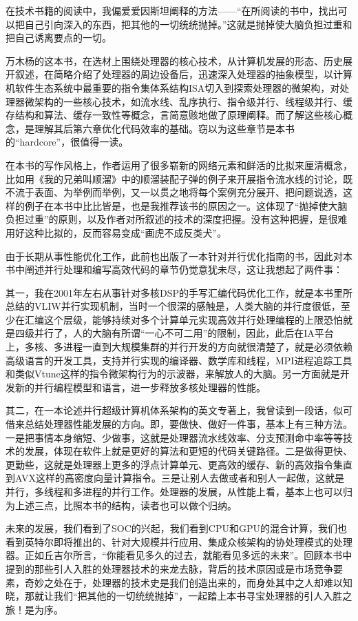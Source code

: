 \documentclass[12pt,UTF8]{ctexbook}
\begin{document}
在技术书籍的阅读中，我偏爱爱因斯坦阐释的方法——“在所阅读的书中，找出可以把自己引向深入的东西，把其他的一切统统抛掉。”这就是抛掉使大脑负担过重和把自己诱离要点的一切。

万木杨的这本书，在选材上围绕处理器的核心技术，从计算机发展的形态、历史展开叙述，在简略介绍了处理器的周边设备后，迅速深入处理器的抽象模型，以计算机软件生态系统中最重要的指令集体系结构ISA切入到探索处理器的微架构，对处理器微架构的一些核心技术，如流水线、乱序执行、指令级并行、线程级并行、缓存结构和算法、缓存一致性等概念，言简意赅地做了原理阐释。而了解这些核心概念，是理解其后第六章优化代码效率的基础。窃以为这些章节是本书的“hardcore”，很值得一读。

在本书的写作风格上，作者运用了很多崭新的网络元素和鲜活的比拟来厘清概念，比如用《我的兄弟叫顺溜》中的顺溜装配子弹的例子来开展指令流水线的讨论，既不流于表面、为举例而举例，又一以贯之地将每个案例充分展开、把问题说透，这样的例子在本书中比比皆是，也是我推荐该书的原因之一。这体现了“抛掉使大脑负担过重”的原则，以及作者对所叙述的技术的深度把握。没有这种把握，是很难用好这种比拟的，反而容易变成“画虎不成反类犬”。

由于长期从事性能优化工作，此前也出版了一本针对并行优化指南的书，因此对本书中阐述并行处理和编写高效代码的章节仍觉意犹未尽，这让我想起了两件事：

其一，我在2001年左右从事针对多核DSP的手写汇编代码优化工作，就是本书里所总结的VLIW并行实现机制，当时一个很深的感触是，人类大脑的并行度很低，至少在汇编这个层级，能够持续对多个计算单元实现高效并行处理编程的上限恐怕就是四级并行了，人的大脑有所谓“一心不可二用”的限制，因此，此后在IA平台上，多核、多进程一直到大规模集群的并行开发的方向就很清楚了，就是必须依赖高级语言的开发工具，支持并行实现的编译器、数学库和线程，MPI进程追踪工具和类似Vtune这样的指令微架构行为的示波器，来解放人的大脑。另一方面就是开发新的并行编程模型和语言，进一步释放多核处理器的性能。

其二，在一本论述并行超级计算机体系架构的英文专著上，我曾读到一段话，似可借来总结处理器性能发展的方向。即，要做快、做好一件事，基本上有三种方法。一是把事情本身缩短、少做事，这就是处理器流水线效率、分支预测命中率等等技术的发展，体现在软件上就是更好的算法和更短的代码关键路径。二是做得更快、更勤些，这就是处理器上更多的浮点计算单元、更高效的缓存、新的高效指令集直到AVX这样的高密度向量计算指令。三是让别人去做或者和别人一起做，这就是并行，多线程和多进程的并行工作。处理器的发展，从性能上看，基本上也可以归为上述三点，比照本书的结构，读者也可以做个归纳。

未来的发展，我们看到了SOC的兴起，我们看到CPU和GPU的混合计算，我们也看到英特尔即将推出的、针对大规模并行应用、集成众核架构的协处理模式的处理器。正如丘吉尔所言，“你能看见多久的过去，就能看见多远的未来”。回顾本书中提到的那些引人入胜的处理器技术的来龙去脉，背后的技术原因或是市场竞争要素，奇妙之处在于，处理器的技术史是我们创造出来的，而身处其中之人却难以知晓，那就让我们“把其他的一切统统抛掉”，一起踏上本书寻宝处理器的引人入胜之旅！是为序。
\end{document}
